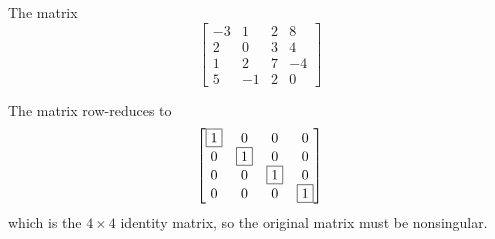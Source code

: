 \documentclass{ximera}
\author{Rob Beezer}
\begin{document}
\begin{exercise}
  The matrix
  \[
    \begin{bmatrix}
      -3 & 1 & 2 & 8\\
      2 & 0 & 3 & 4\\
      1 & 2 & 7 & -4\\
      5 & -1 & 2 & 0
    \end{bmatrix}
  \]
  \begin{multipleChoice}
  \end{multipleChoice}

  \begin{feedback}[correct]
    The matrix row-reduces to
    \[
      \begin{bmatrix}
        \fbox{1}&  0 &  0 &  0\\
        0 & \fbox{1} &  0 &  0\\
        0 &  0 & \fbox{1} &  0\\
        0 &  0 &  0 & \fbox{1}
      \end{bmatrix}
    \]
    which is the $4\times 4$ identity matrix, so the original matrix must be nonsingular.
  \end{feedback}
\end{exercise}
\end{document}
